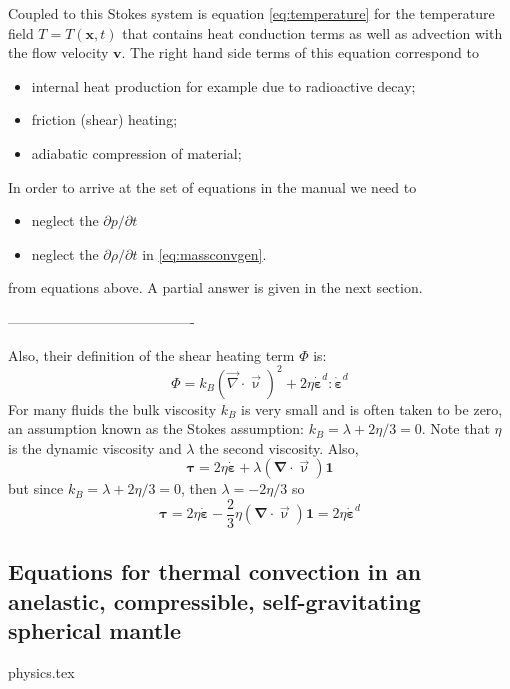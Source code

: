 Coupled to this Stokes system is equation \eqref{eq:temperature} for the
temperature field $T=T(\mathbf x,t)$ that contains heat conduction terms as
well as advection with the flow velocity $\mathbf v$. The right hand side
terms of this equation correspond to
\begin{itemize}
\item internal heat production for example due to radioactive decay;
\item friction (shear) heating;
\item adiabatic compression of material;
\end{itemize}

In order to arrive at the set of equations in the \aspect manual
we need to 
\begin{itemize}
\item neglect the $\partial p/\partial t$  
\item neglect the $\partial \rho / \partial t$  in \eqref{eq:massconvgen}.
\end{itemize}
from equations above. A partial answer is given in the next section. 

----------------------------------------

Also, their definition of the shear heating term $\Phi$ is:
\[
\Phi = k_B ({\vec \nabla}\cdot{\vec \upnu})^2 + 2\eta \dot{\bm \varepsilon}^d:\dot{\bm \varepsilon}^d
\]
For many fluids the bulk viscosity $k_B$ is very small and is often taken to be zero, an assumption known
as the Stokes assumption: $k_B=\lambda+2\eta/3=0$. 
Note that $\eta$ is the dynamic viscosity and $\lambda$ the second viscosity. 
Also, 
\[
{\bm \tau}=2\eta \dot{\bm \varepsilon} + \lambda ({\bm \nabla}\cdot{\vec \upnu}) {\bm 1}
\]
but since $k_B=\lambda+2\eta/3=0$, then $\lambda=-2\eta/3$ so 
\[
{\bm \tau}=2\eta \dot{\bm \varepsilon} -\frac{2}{3}\eta ({\bm \nabla}\cdot{\vec \upnu}) {\bm 1} = 2\eta \dot{\bm \varepsilon}^d
\]

\newpage
\subsection{Equations for thermal convection in an anelastic, compressible, self-gravitating spherical mantle }
\begin{flushright} {\tiny {\color{gray} physics.tex}} \end{flushright}


